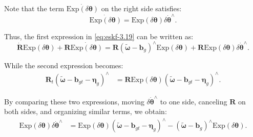 Note that the term $\dot{\mathrm{Exp}(\delta \boldsymbol{\theta})}$ on the right side satisfies:
\begin{equation}
	\dot{\mathrm{Exp}(\delta \boldsymbol{\theta})} = \mathrm{Exp}(\delta \boldsymbol{\theta}) \delta 
	\dot{\boldsymbol{\theta}}^\wedge.
\end{equation} 

Thus, the first expression in \eqref{eq:eskf-3.19} can be written as:
\begin{equation}\label{key}
	\dot{\bm{R}} \mathrm{Exp} (\delta \boldsymbol{\theta}) + \bm{R} \dot{\mathrm{Exp}(\delta 
		\boldsymbol{\theta})} = \bm{R} (\tilde{\boldsymbol{\omega}}-\bm{b}_g)^\wedge 
	\mathrm{Exp}(\delta \boldsymbol{\theta}) + \bm{R} \mathrm{Exp}(\delta \boldsymbol{\theta} ) 
	\delta \dot{\boldsymbol{\theta}}^\wedge.
\end{equation}

While the second expression becomes:
\begin{equation}\label{key}
	\begin{aligned}
		\bm{R}_t \left( \tilde{\boldsymbol{\omega}} - \bm{b}_{gt} - \boldsymbol{\eta}_g \right)^\wedge 
		&= \bm{R}  \mathrm{Exp} (\delta \boldsymbol{\theta}) \left( \tilde{\boldsymbol{\omega}} - 
		\bm{b}_{gt} - \boldsymbol{\eta}_g \right)^\wedge.
	\end{aligned}
\end{equation}

By comparing these two expressions, moving $\delta \dot{\boldsymbol{\theta}}^\wedge$ to one side, canceling $\bm{R}$ on both sides, and organizing similar terms, we obtain:
\begin{equation}
	\begin{aligned}
		\mathrm{Exp} (\delta \boldsymbol{\theta}) \delta \dot{\boldsymbol{\theta}}^\wedge &= 
		\mathrm{Exp} (\delta \boldsymbol{\theta}) \left( \tilde{\boldsymbol{\omega}} - \bm{b}_{gt} - 
		\boldsymbol{\eta}_g \right)^\wedge - (\tilde{\boldsymbol{\omega}}-\bm{b}_g)^\wedge 
		\mathrm{Exp}(\delta \boldsymbol{\theta}).
	\end{aligned}
\end{equation}

